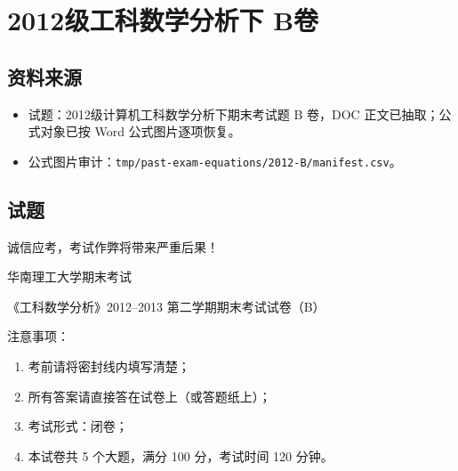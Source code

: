 \section{2012级工科数学分析下 B卷}

\subsection{资料来源}
\begin{itemize}
  \item 试题：2012级计算机工科数学分析下期末考试题 B 卷，DOC 正文已抽取；公式对象已按 Word 公式图片逐项恢复。
  \item 公式图片审计：\texttt{tmp/past-exam-equations/2012-B/manifest.csv}。
\end{itemize}

\subsection{试题}
诚信应考，考试作弊将带来严重后果！

华南理工大学期末考试

《工科数学分析》2012--2013 第二学期期末考试试卷（B）

注意事项：
\begin{enumerate}
  \item 考前请将密封线内填写清楚；
  \item 所有答案请直接答在试卷上（或答题纸上）；
  \item 考试形式：闭卷；
  \item 本试卷共 5 个大题，满分 100 分，考试时间 120 分钟。
\end{enumerate}

